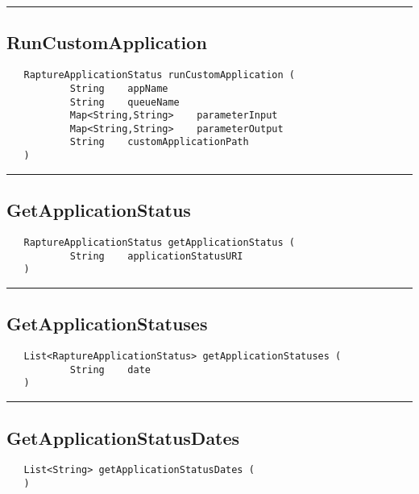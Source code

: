 \rule{15cm}{2pt}
\subsection{RunCustomApplication}
\label{Api:RunCustomApplication}
\begin{verbatim}
   RaptureApplicationStatus runCustomApplication (
           String    appName
           String    queueName
           Map<String,String>    parameterInput
           Map<String,String>    parameterOutput
           String    customApplicationPath
   )
\end{verbatim}



\rule{15cm}{2pt}
\subsection{GetApplicationStatus}
\label{Api:GetApplicationStatus}
\begin{verbatim}
   RaptureApplicationStatus getApplicationStatus (
           String    applicationStatusURI
   )
\end{verbatim}



\rule{15cm}{2pt}
\subsection{GetApplicationStatuses}
\label{Api:GetApplicationStatuses}
\begin{verbatim}
   List<RaptureApplicationStatus> getApplicationStatuses (
           String    date
   )
\end{verbatim}



\rule{15cm}{2pt}
\subsection{GetApplicationStatusDates}
\label{Api:GetApplicationStatusDates}
\begin{verbatim}
   List<String> getApplicationStatusDates (
   )
\end{verbatim}




